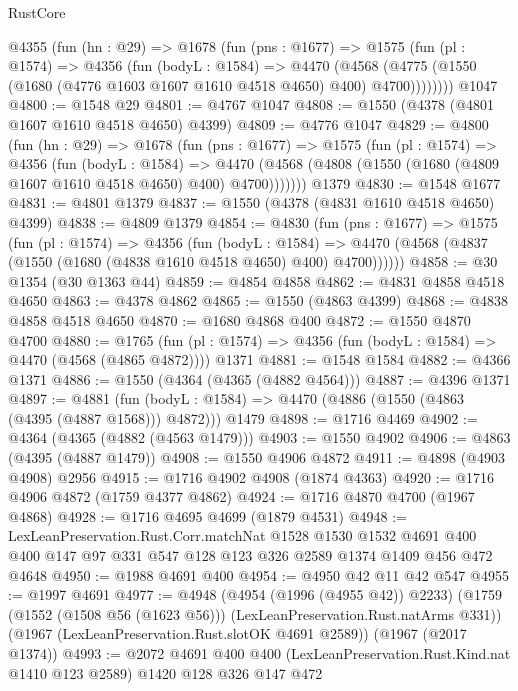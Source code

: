 \begin{lexlean}{RustCore}
\begin{coremodule}
    @4355
      (fun (hn : @29) =>
      @1678
        (fun (pns : @1677) =>
        @1575
          (fun (pl : @1574) =>
          @4356
            (fun (bodyL : @1584) =>
            @4470
              (@4568 (@4775 (@1550 (@1680 (@4776 @1603 @1607 @1610 @4518 @4650) @400) @4700))))))))
    @1047
@4800 := @1548 @29
@4801 := @4767 @1047
@4808 := @1550 (@4378 (@4801 @1607 @1610 @4518 @4650) @4399)
@4809 := @4776 @1047
@4829 := @4800
    (fun (hn : @29) =>
    @1678
      (fun (pns : @1677) =>
      @1575
        (fun (pl : @1574) =>
        @4356
          (fun (bodyL : @1584) =>
          @4470 (@4568 (@4808 (@1550 (@1680 (@4809 @1607 @1610 @4518 @4650) @400) @4700)))))))
    @1379
@4830 := @1548 @1677
@4831 := @4801 @1379
@4837 := @1550 (@4378 (@4831 @1610 @4518 @4650) @4399)
@4838 := @4809 @1379
@4854 := @4830
    (fun (pns : @1677) =>
    @1575
      (fun (pl : @1574) =>
      @4356
        (fun (bodyL : @1584) =>
        @4470 (@4568 (@4837 (@1550 (@1680 (@4838 @1610 @4518 @4650) @400) @4700))))))
@4858 := @30 @1354 (@30 @1363 @44)
@4859 := @4854 @4858
@4862 := @4831 @4858 @4518 @4650
@4863 := @4378 @4862
@4865 := @1550 (@4863 @4399)
@4868 := @4838 @4858 @4518 @4650
@4870 := @1680 @4868 @400
@4872 := @1550 @4870 @4700
@4880 := @1765
    (fun (pl : @1574) => @4356 (fun (bodyL : @1584) => @4470 (@4568 (@4865 @4872))))
    @1371
@4881 := @1548 @1584
@4882 := @4366 @1371
@4886 := @1550 (@4364 (@4365 (@4882 @4564)))
@4887 := @4396 @1371
@4897 := @4881
    (fun (bodyL : @1584) => @4470 (@4886 (@1550 (@4863 (@4395 (@4887 @1568))) @4872)))
    @1479
@4898 := @1716 @4469
@4902 := @4364 (@4365 (@4882 (@4563 @1479)))
@4903 := @1550 @4902
@4906 := @4863 (@4395 (@4887 @1479))
@4908 := @1550 @4906 @4872
@4911 := @4898 (@4903 @4908) @2956
@4915 := @1716 @4902 @4908 (@1874 @4363)
@4920 := @1716 @4906 @4872 (@1759 @4377 @4862)
@4924 := @1716 @4870 @4700 (@1967 @4868)
@4928 := @1716 @4695 @4699 (@1879 @4531)
@4948 := LexLeanPreservation.Rust.Corr.matchNat
    @1528
    @1530
    @1532
    @4691
    @400
    @400
    @147
    @97
    @331
    @547
    @128
    @123
    @326
    @2589
    @1374
    @1409
    @456
    @472
    @4648
@4950 := @1988 @4691 @400
@4954 := @4950 @42 @11 @42 @547
@4955 := @1997 @4691
@4977 := @4948
    (@4954 (@1996 (@4955 @42)) @2233)
    (@1759 (@1552 (@1508 @56 (@1623 @56))) (LexLeanPreservation.Rust.natArms @331))
    (@1967 (LexLeanPreservation.Rust.slotOK @4691 @2589))
    (@1967 (@2017 @1374))
@4993 := @2072
    @4691
    @400
    @400
    (LexLeanPreservation.Rust.Kind.nat @1410 @123 @2589)
    @1420
    @128
    @326
    @147
    @472

\end{coremodule}
\end{lexlean}
